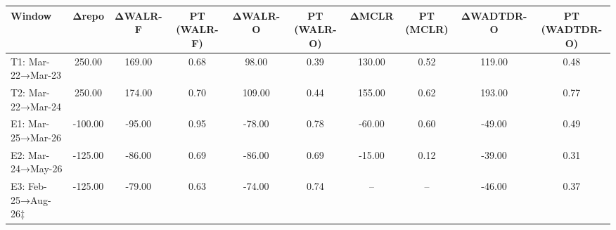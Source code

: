 \begin{tabular}{lccccccccc}
\toprule
Window & Δrepo & ΔWALR-F & PT (WALR-F) & ΔWALR-O & PT (WALR-O) & ΔMCLR & PT (MCLR) & ΔWADTDR-O & PT (WADTDR-O) \\
\midrule
T1: Mar-22→Mar-23 & 250.00 & 169.00 & 0.68 & 98.00 & 0.39 & 130.00 & 0.52 & 119.00 & 0.48 \\
T2: Mar-22→Mar-24 & 250.00 & 174.00 & 0.70 & 109.00 & 0.44 & 155.00 & 0.62 & 193.00 & 0.77 \\
E1: Mar-25→Mar-26 & -100.00 & -95.00 & 0.95 & -78.00 & 0.78 & -60.00 & 0.60 & -49.00 & 0.49 \\
E2: Mar-24→May-26 & -125.00 & -86.00 & 0.69 & -86.00 & 0.69 & -15.00 & 0.12 & -39.00 & 0.31 \\
E3: Feb-25→Aug-26‡ & -125.00 & -79.00 & 0.63 & -74.00 & 0.74 & – & – & -46.00 & 0.37 \\
\bottomrule
\end{tabular}
